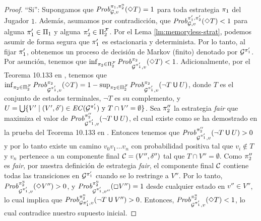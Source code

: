 \iffalse
\begin{proof}
``Si'': Supongamos que $\mathit{Prob}^{\pi_{1}, \pi^{\mathrm{u}}_{2}}_{\mathcal{G},v}(\Diamond T)=1$ para toda estrategia $\pi_{1}$ del Jugador $1$.  Además, 
asumamos por contradicción, que
$\mathit{Prob}^{\pi_{1}', \pi_{2}'}_{\mathcal{G},v}(\Diamond T) < 1$ para alguna $\pi_{1}'\in \Pi_{1}$ y alguna $\pi_{2}'\in \Pi^{\mathcal{F}}_{2}$. 
Por el Lema \ref{lm:memoryless-strat}, podemos asumir de forma segura que $\pi_{1}'$ es estacionaria y determinista.
Por lo tanto, al fijar $\pi_{1}'$, obtenemos un proceso de decisión de Markov (finito) denotado por $\mathcal{G}^{\pi_{1}'}$.
Por asunción, tenemos que
$\inf_{\pi_{2} \in \Pi^{\mathcal{F}}_{2}} \mathit{Prob}^{\pi_{2}}_{\mathcal{G}^{\pi_{1}'},v}(\Diamond T) < 1 $. Adicionalmente, por el Teorema 10.133 en \cite{BaierK08}, tenemos que $\inf_{ \pi_{2} \in \Pi^{\mathcal{F}}_{2}}\mathit{Prob}^{\pi_{2}}_{\mathcal{G}^{\pi_{1}'},v}(\Diamond T) = 1 - \sup_{\pi_{2} \in \Pi^{\mathcal{F}}_{2}} \mathit{Prob}^{\pi_{2}}_{\mathcal{G}^{\pi_{1}'},v}(\neg T \mathbin{\textsf{U}} U)$, donde $T$ es el conjunto de estados terminales,  $\neg T$ es su complemento, y
$U = \bigcup \{ V' \mid (V', \delta') \in \mathit{EC}(\mathcal{G}^{\pi_{1}'}) \text{ y }  T \cap V' = \emptyset\}$.
Sea $\pi_{2}''$ la estrategia \textit{fair} que maximiza el valor de $\mathit{Prob}^{\pi_{2}''}_{\mathcal{G}^{\pi_{1}'},v}(\neg T \mathbin{\textsf{U}} U)$, el cual existe como se ha demostrado en la prueba del Teorema 10.133 en \cite{BaierK08}.
Entonces tenemos que $\mathit{Prob}^{\pi_{2}''}_{\mathcal{G}^{\pi_{1}'},v}(\neg T \mathbin{\textsf{U}} U) > 0$ y por lo tanto existe
un camino $v_0 v_1 \dots v_n$ con probabilidad positiva tal que $v_i \notin T$ y $v_n$ pertenece a un componente final $\mathcal{C} = (V'', \delta'')$
tal que $T \cap V'' = \emptyset$. Como $\pi_{2}''$ es \textit{fair}, por nuestra definición de estrategia \textit{fair}, el componente final $\mathcal{C}$ contiene todas las transiciones en $\mathcal{G}^{\pi_{1}'}$ cuando se lo restringe a $V''$.
Por lo tanto, $\mathit{Prob}^{\pi^{\mathrm{u}}_{2}}_{\mathcal{G}^{\pi_{1}'},v}(\Diamond V'') > 0$, y 
$\mathit{Prob}^{\pi^{\mathrm{u}}_{2}}_{\mathcal{G}^{\pi_{1}'},v''}(\Box V'') = 1 $ 
desde cualquier estado en $v'' \in V''$, lo cual implica que $\mathit{Prob}^{\pi^{\mathrm{u}}_{2}}_{\mathcal{G}{\pi_{1}'},v}(\neg T \mathbin{\textsf{U}} V'') > 0$. 
Entonces, $\mathit{Prob}^{\pi^{\mathrm{u}}_{2}}_{\mathcal{G}^{\pi_{1}'},v}(\Diamond T) < 1$, lo cual contradice nuestro supuesto inicial.


\end{proof}
